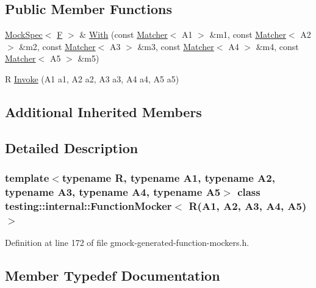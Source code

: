 \subsection*{Public Member Functions}
\begin{DoxyCompactItemize}
\item 
\hyperlink{classtesting_1_1internal_1_1MockSpec}{Mock\+Spec}$<$ \hyperlink{classtesting_1_1internal_1_1FunctionMocker_3_01R_07A1_00_01A2_00_01A3_00_01A4_00_01A5_08_4_a26144c33c64b0af26a1d0c43806a0370}{F} $>$ \& \hyperlink{classtesting_1_1internal_1_1FunctionMocker_3_01R_07A1_00_01A2_00_01A3_00_01A4_00_01A5_08_4_a719a0f9a249c92c3b990f5ea380899ff}{With} (const \hyperlink{classtesting_1_1Matcher}{Matcher}$<$ A1 $>$ \&m1, const \hyperlink{classtesting_1_1Matcher}{Matcher}$<$ A2 $>$ \&m2, const \hyperlink{classtesting_1_1Matcher}{Matcher}$<$ A3 $>$ \&m3, const \hyperlink{classtesting_1_1Matcher}{Matcher}$<$ A4 $>$ \&m4, const \hyperlink{classtesting_1_1Matcher}{Matcher}$<$ A5 $>$ \&m5)
\item 
R \hyperlink{classtesting_1_1internal_1_1FunctionMocker_3_01R_07A1_00_01A2_00_01A3_00_01A4_00_01A5_08_4_a481d6a28daaba552a9d36a9d67e4a3db}{Invoke} (A1 a1, A2 a2, A3 a3, A4 a4, A5 a5)
\end{DoxyCompactItemize}
\subsection*{Additional Inherited Members}


\subsection{Detailed Description}
\subsubsection*{template$<$typename R, typename A1, typename A2, typename A3, typename A4, typename A5$>$\newline
class testing\+::internal\+::\+Function\+Mocker$<$ R(\+A1, A2, A3, A4, A5)$>$}



Definition at line 172 of file gmock-\/generated-\/function-\/mockers.\+h.



\subsection{Member Typedef Documentation}
\mbox{\label{classtesting_1_1internal_1_1FunctionMocker_3_01R_07A1_00_01A2_00_01A3_00_01A4_00_01A5_08_4_ac82403b3f3e4e65797bb633ade91a43e}} 
